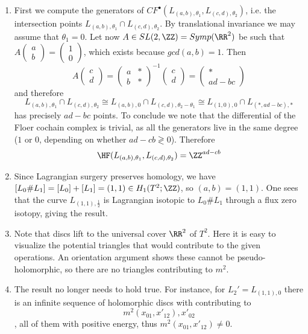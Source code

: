
\begin{enumerate}
    \item First we compute the generators of $CF^\bullet(L_{(a,b),\theta_1},L_{(c,d),\theta_2})$, i.e. the intersection points $L_{(a,b),\theta_1}\cap L_{(c,d),\theta_2}$. By translational invariance we may assume that $\theta_1=0$. Let now  $A\in SL(2,\ZZ)=Symp(\RR^2)$ be such that 
    \(A\begin{pmatrix}
    a\\
    b
    \end{pmatrix}=
    \begin{pmatrix}
    1\\
    0
    \end{pmatrix}\), which exists because $gcd(a,b)=1$. Then
    \[
    A \begin{pmatrix}
    c\\
    d
    \end{pmatrix}
    =
    \begin{pmatrix}
    a & *\\
    b & *
    \end{pmatrix}^{-1}
    \begin{pmatrix}
    c\\
    d
    \end{pmatrix}
    =\begin{pmatrix}
    *\\
    ad-bc
    \end{pmatrix}
    \]
    and therefore \[L_{(a,b),\theta_1}\cap L_{(c,d),\theta_2}\cong L_{(a,b),0}\cap L_{(c,d),\theta_2-\theta_1}\cong L_{(1,0),0}\cap L_{(*,ad-bc),*}\] has precisely $ad-bc$ points. To conclude we note that the differential of the Floer cochain complex is trivial, as all the generators live in the same degree ($1$ or $0$, depending on whether $ad-cb\gtrless0$). Therefore
    \[
   \HF(L_{(a,b),\theta_1},L_{(c,d),\theta_2})=\ZZ^{ad-cb}
    \]

    
    \item Since Lagrangian surgery preserves homology, we have $[L_0\# L_1]=[L_0]+[L_1]=(1,1)\in H_1(T^2;\ZZ)$, so $(a,b)=(1,1)$. One sees that the curve $L_{(1,1),\frac{1}{2}}$ is Lagrangian isotopic to $L_0\#L_1$ through a flux zero isotopy, giving the result. 
    \item Note that discs lift to the universal cover $\RR^2$ of $T^2$. Here it is easy to visualize the potential triangles that would contribute to the given operations. An orientation argument shows these cannot be pseudo-holomorphic, so there are no triangles contributing to $m^2$.
    \item The result no longer needs to hold true. For instance, for $L_2'=L_{(1,1),0}$ there is an infinite sequence of holomorphic discs with contributing to \[m^2(x_{01},x'_{12}),x'_{02}\], all of them with positive energy, thus $m^2(x_{01},x'_{12})\neq 0$.
\end{enumerate}